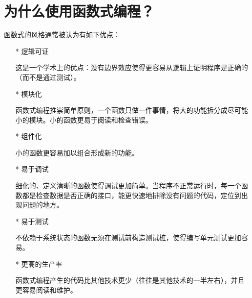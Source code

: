 \documentclass[12pt,a4paper]{report}
\begin{document}
\section{为什么使用函数式编程？} 
函数式的风格通常被认为有如下优点： 
\begin{enumerate}
\item[*]逻辑可证 
    
    这是一个学术上的优点：没有边界效应使得更容易从逻辑上证明程序是正确的（而不是通过测试）。

\item[*]模块化
    
    函数式编程推崇简单原则，一个函数只做一件事情，将大的功能拆分成尽可能小的模块。小的函数更易于阅读和检查错误。

\item[*]组件化

    小的函数更容易加以组合形成新的功能。

\item[*]易于调试
    
    细化的、定义清晰的函数使得调试更加简单。当程序不正常运行时，每一个函数都是检查数据是否正确的接口，能更快速地排除没有问题的代码，定位到出现问题的地方。

\item[*]易于测试
    
    不依赖于系统状态的函数无须在测试前构造测试桩，使得编写单元测试更加容易。

\item[*]更高的生产率
    
    函数式编程产生的代码比其他技术更少（往往是其他技术的一半左右），并且更容易阅读和维护。

\end{enumerate}
\end{document}
